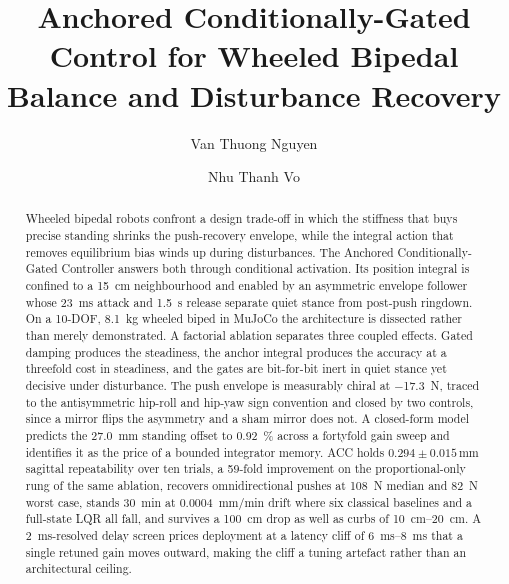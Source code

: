\documentclass[a4paper,fleqn]{cas-dc}
\begin{document}
\let\WriteBookmarks\relax


\title[mode = title]{Anchored Conditionally-Gated Control for Wheeled Bipedal
Balance and Disturbance Recovery}

\RenewDocumentCommand\printorcid{}{}
\author[1]{Van Thuong Nguyen}

\author[1]{Nhu Thanh Vo}
\cormark[1]



\begin{abstract}
Wheeled bipedal robots confront a design trade-off in which the stiffness that
buys precise standing shrinks the push-recovery envelope, while the integral
action that removes equilibrium bias winds up during disturbances. The Anchored
Conditionally-Gated Controller answers both through conditional activation. Its
position integral is confined to a \SI{15}{cm} neighbourhood and enabled by an
asymmetric envelope follower whose \SI{23}{ms} attack and \SI{1.5}{s} release
separate quiet stance from post-push ringdown. On a \num{10}-DOF, \SI{8.1}{kg}
wheeled biped in MuJoCo the architecture is dissected rather than merely
demonstrated. A factorial ablation separates three coupled effects. Gated
damping produces the steadiness, the anchor integral produces the accuracy at a
threefold cost in steadiness, and the gates are bit-for-bit inert in quiet
stance yet decisive under disturbance. The push envelope is measurably chiral at
\SI{-17.3}{N}, traced to the antisymmetric hip-roll and hip-yaw sign convention
and closed by two controls, since a mirror flips the asymmetry and a sham mirror
does not. A closed-form model predicts the \SI{27.0}{mm} standing offset to
\SI{0.92}{\percent} across a fortyfold gain sweep and identifies it as the price
of a bounded integrator memory. ACC holds $0.294{\pm}0.015$\,mm sagittal
repeatability over ten trials, a \num{59}-fold improvement on the
proportional-only rung of the same ablation, recovers omnidirectional pushes at
\SI{108}{N} median and \SI{82}{N} worst case, stands \SI{30}{min} at
\SI{0.0004}{mm/min} drift where six classical baselines and a full-state LQR all
fall, and survives a \SI{100}{cm} drop as well as curbs of
\SIrange{10}{20}{cm}. A \SI{2}{ms}-resolved delay screen prices deployment at a
latency cliff of \SIrange{6}{8}{ms} that a single retuned gain moves outward,
making the cliff a tuning artefact rather than an architectural ceiling.
\end{abstract}
\end{document}
